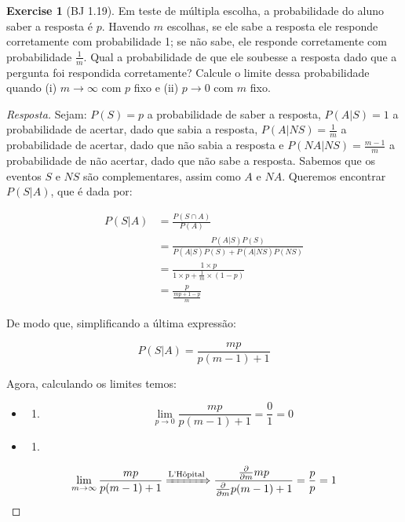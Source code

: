 \documentclass[
]{article}
\providecommand{\tightlist}{%
  \setlength{\itemsep}{0pt}\setlength{\parskip}{0pt}}
\theoremstyle{definition}
\theoremstyle{definition}
\theoremstyle{definition}
\newtheorem{exercise}{Exercise}[section]
\theoremstyle{definition}
\theoremstyle{remark}
\begin{document}
\begin{exercise}[BJ 1.19]

Em teste de múltipla escolha, a probabilidade do aluno saber a resposta é \(p\). Havendo \(m\) escolhas, se ele sabe a resposta ele responde corretamente com probabilidade 1; se não sabe, ele responde corretamente com probabilidade \(\frac{1}{m}\). Qual a probabilidade de que ele soubesse a resposta dado que a pergunta foi respondida corretamente? Calcule o limite dessa probabilidade quando (i) \(m \to \infty\) com \(p\) fixo e (ii) \(p \to 0\) com \(m\) fixo.

\begin{proof}[Resposta]
Sejam: \(P(S) = p\) a probabilidade de saber a resposta, \(P(A|S) = 1\) a probabilidade de acertar, dado que sabia a resposta, \(P(A|NS) = \frac{1}{m}\) a probabilidade de acertar, dado que não sabia a resposta e \(P(NA|NS) = \frac{m-1}{m}\) a probabilidade de não acertar, dado que não sabe a resposta. Sabemos que os eventos \(S\) e \(NS\) são complementares, assim como \(A\) e \(NA\). Queremos encontrar \(P(S|A)\), que é dada por:

\begin{align*}
P(S|A) &= \frac{P(S \cap A)}{P(A)} \\
&= \frac{P(A|S) P(S)}{P(A|S)P(S) + P(A|NS)P(NS)} \\
&= \frac{1 \times p}{1 \times p + \frac{1}{m} \times (1-p)} \\
&= \frac{p}{\frac{mp + 1 - p}{m}}
\end{align*}

De modo que, simplificando a última expressão:

\begin{equation}
P(S|A) = \frac{mp}{p(m-1)+1}
\label{eq:pdesdadoa}
\end{equation}

Agora, calculando os limites temos:

\begin{itemize}
\item
  \begin{enumerate}
  \def\labelenumi{(\roman{enumi})}
  \tightlist
  \item
    \begin{equation*}
    \lim_{p \to 0} \frac{mp}{p(m-1)+1} = \frac{0}{1} = 0
    \end{equation*}
  \end{enumerate}
\item
  \begin{enumerate}
  \def\labelenumi{(\roman{enumi})}
  \setcounter{enumi}{1}
  \tightlist
  \item
  \end{enumerate}
\end{itemize}

\begin{equation*}
\lim_{m \to \infty} \frac{mp}{p(m-1)+1} \xRightarrow{\text{L'Hôpital}} \frac{\frac{\partial}{\partial m}mp}{\frac{\partial}{\partial m}p(m-1)+1} = \frac{p}{p} = 1
\end{equation*}
\end{proof}

\end{exercise}
\end{document}

